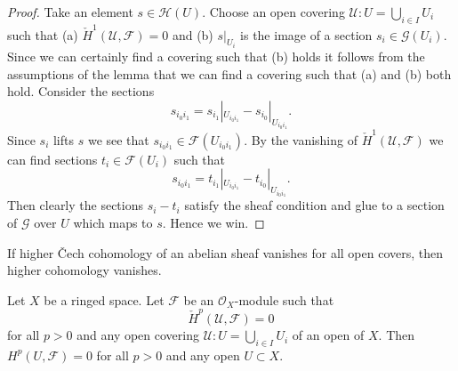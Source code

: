 \begin{proof}
Take an element $s \in \mathcal{H}(U)$. Choose an open covering
$\mathcal{U} : U = \bigcup_{i \in I} U_i$ such that
(a) $\check{H}^1(\mathcal{U}, \mathcal{F}) = 0$ and (b)
$s|_{U_i}$ is the image of a section $s_i \in \mathcal{G}(U_i)$.
Since we can certainly find a covering such that (b) holds
it follows from the assumptions of the lemma that we can find
a covering such that (a) and (b) both hold.
Consider the sections
$$
s_{i_0i_1} = s_{i_1}|_{U_{i_0i_1}} - s_{i_0}|_{U_{i_0i_1}}.
$$
Since $s_i$ lifts $s$ we see that $s_{i_0i_1} \in \mathcal{F}(U_{i_0i_1})$.
By the vanishing of $\check{H}^1(\mathcal{U}, \mathcal{F})$ we can
find sections $t_i \in \mathcal{F}(U_i)$ such that
$$
s_{i_0i_1} = t_{i_1}|_{U_{i_0i_1}} - t_{i_0}|_{U_{i_0i_1}}.
$$
Then clearly the sections $s_i - t_i$ satisfy the sheaf condition
and glue to a section of $\mathcal{G}$ over $U$ which maps to $s$.
Hence we win.
\end{proof}

\begin{lemma}
\label{lemma-cech-vanish}
\begin{slogan}
If higher {\v C}ech cohomology of an abelian sheaf vanishes for all open covers,
then higher cohomology vanishes.
\end{slogan}
Let $X$ be a ringed space.
Let $\mathcal{F}$ be an $\mathcal{O}_X$-module such that
$$
\check{H}^p(\mathcal{U}, \mathcal{F}) = 0
$$
for all $p > 0$ and any open covering $\mathcal{U} : U = \bigcup_{i \in I} U_i$
of an open of $X$. Then $H^p(U, \mathcal{F}) = 0$ for all $p > 0$
and any open $U \subset X$.
\end{lemma}

